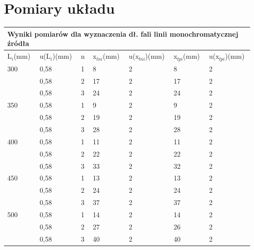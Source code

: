\documentclass[12pt]{article}
\begin{document}
\section{Pomiary układu}

\begin{table}[!ht]
    \centering
    \begin{tabular}{|l|l|l|l|l|l|l|}
    \hline
    \multicolumn{7}{|l|}{Wyniki pomiarów dla wyznaczenia dł. fali linii monochromatycznej źródła} \\
    \hline
        L$_i$(mm) & u(L$_i$)(mm) & n & x$_{lni}$(mm) & u(x$_{lni}$)(mm) & x$_{lpi}$(mm) & u(x$_{lpi}$)(mm) \\ \hline
        300 & 0,58 & 1 & 8 & 2 & 8 & 2 \\
        ~ & 0,58 & 2 & 17 & 2 & 17 & 2 \\ 
        ~ & 0,58 & 3 & 24 & 2 & 24 & 2 \\ \hline
        350 & 0,58 & 1 & 9 & 2 & 9 & 2 \\
        ~ & 0,58 & 2 & 19 & 2 & 19 & 2 \\ 
        ~ & 0,58 & 3 & 28 & 2 & 28 & 2 \\ \hline
        400 & 0,58 & 1 & 11 & 2 & 11 & 2 \\ 
        ~ & 0,58 & 2 & 22 & 2 & 22 & 2 \\ 
        ~ & 0,58 & 3 & 33 & 2 & 32 & 2 \\ \hline
        450 & 0,58 & 1 & 13 & 2 & 13 & 2 \\ 
        ~ & 0,58 & 2 & 24 & 2 & 24 & 2 \\ 
        ~ & 0,58 & 3 & 37 & 2 & 37 & 2 \\ \hline
        500 & 0,58 & 1 & 14 & 2 & 14 & 2 \\ 
        ~ & 0,58 & 2 & 27 & 2 & 26 & 2 \\ 
        ~ & 0,58 & 3 & 40 & 2 & 40 & 2 \\ \hline
    \end{tabular}
\end{table}
\end{document}

